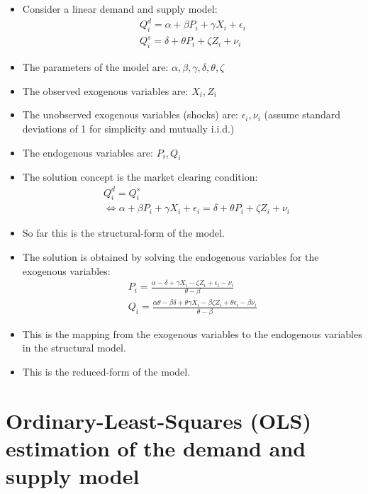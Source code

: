 \documentclass[
]{book}
\begin{document}
\begin{itemize}
\item
  Consider a linear demand and supply model:
  \begin{align}
      Q_i^d = \alpha + \beta P_i + \gamma X_i + \epsilon_i \\
      Q_i^s = \delta + \theta P_i + \zeta Z_i + \nu_i
  \end{align}
\item
  The parameters of the model are: \(\alpha, \beta, \gamma, \delta, \theta, \zeta\)
\item
  The observed exogenous variables are: \(X_i, Z_i\)
\item
  The unobserved exogenous variables (shocks) are: \(\epsilon_i, \nu_i\) (assume standard deviations of 1 for simplicity and mutually i.i.d.)
\item
  The endogenous variables are: \(P_i, Q_i\)
\item
  The solution concept is the market clearing condition:
  \begin{align}
    &Q_i^d = Q_i^s \\
    &\Leftrightarrow \alpha + \beta P_i + \gamma X_i + \epsilon_i = \delta + \theta P_i + \zeta Z_i + \nu_i
  \end{align}
\item
  So far this is the structural-form of the model.
\item
  The solution is obtained by solving the endogenous variables for the exogenous variables:
  \begin{align}
    P_i = \frac{\alpha - \delta + \gamma X_i - \zeta Z_i + \epsilon_i - \nu_i}{\theta - \beta} \\
    Q_i = \frac{\alpha \theta - \beta \delta + \theta \gamma X_i - \beta \zeta Z_i + \theta \epsilon_i - \beta \nu_i}{\theta - \beta}
  \end{align}
\item
  This is the mapping from the exogenous variables to the endogenous variables in the structural model.
\item
  This is the reduced-form of the model.
\end{itemize}

\hypertarget{ordinary-least-squares-ols-estimation-of-the-demand-and-supply-model}{%
\section{Ordinary-Least-Squares (OLS) estimation of the demand and supply model}\label{ordinary-least-squares-ols-estimation-of-the-demand-and-supply-model}}
\end{document}
